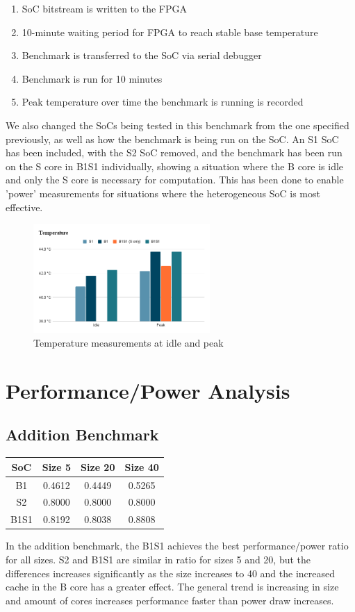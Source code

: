 \begin{enumerate}
    \item SoC bitstream is written to the FPGA
    \item 10-minute waiting period for FPGA to reach stable base temperature
    \item Benchmark is transferred to the SoC via serial debugger
    \item Benchmark is run for 10 minutes
    \item Peak temperature over time the benchmark is running is recorded
\end{enumerate}

We also changed the SoCs being tested in this benchmark from the one specified previously, as well as how the benchmark is being run on the SoC. An S1 SoC has been included, with the S2 SoC removed, and the benchmark has been run on the S core in B1S1 individually, showing a situation where the B core is idle and only the S core is necessary for computation. This has been done to enable 'power' measurements for situations where the heterogeneous SoC is most effective.

\begin{figure}[H]
    \centering
    \includegraphics[width=0.6\textwidth]{img/Temperature.png}
    \caption{Temperature measurements at idle and peak}
    \label{fig:soc_temps}
\end{figure}

\section{Performance/Power Analysis}
\subsection{Addition Benchmark}
\begin{center}
\begin{tabular}{c c c c}
    SoC & Size 5 & Size 20 & Size 40 \\
    \hline
    B1 & 0.4612 & 0.4449 & 0.5265 \\
    \hline
    S2 & 0.8000 & 0.8000 & 0.8000 \\
    \hline
    B1S1 & 0.8192 & 0.8038 & 0.8808\\
    \hline
\end{tabular}
\end{center}
In the addition benchmark, the B1S1 achieves the best performance/power ratio for all sizes. S2 and B1S1 are similar in ratio for sizes 5 and 20, but the differences increases significantly as the size increases to 40 and the increased cache in the B core has a greater effect. The general trend is increasing in size and amount of cores increases performance faster than power draw increases.

